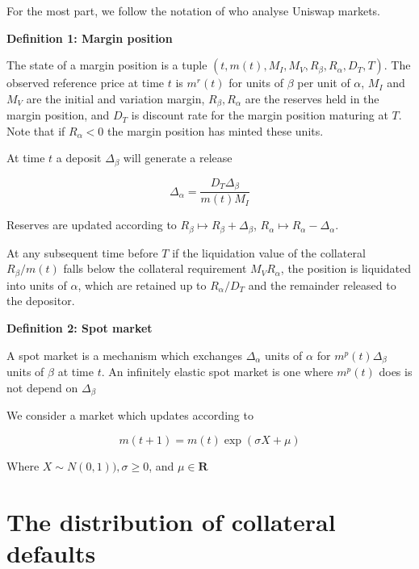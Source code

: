 \documentclass[12pt]{article}
\begin{document}
For the most part, we follow the notation of \cite{ang20} who analyse Uniswap markets.

\textbf{Definition 1: Margin position}


The state of a margin position is a tuple $(t, m(t), M_I, M_V, R_\beta, R_\alpha, D_T, T)$. The observed reference price at time $t$ is $m^r(t)$ for units of $\beta$ per unit of $\alpha$, $M_I$ and $M_V$ are the initial and variation margin, $R_\beta, R_\alpha$ are the reserves held in the margin position, and $D_T$ is discount rate for the margin position maturing at $T$. Note that if $R_\alpha<0$ the margin position has minted these units.

At time $t$ a deposit $\Delta_\beta$  will generate a release 

\begin{equation} \label{Delta_alpha}
\Delta_\alpha = \frac{D_T \Delta_\beta}{m(t) M_I }
\end{equation}


Reserves are updated according to $R_\beta \mapsto R_\beta + \Delta_\beta$, $R_\alpha \mapsto R_\alpha - \Delta_\alpha$. 

At any subsequent time before $T$ if the liquidation value of the collateral $R_\beta/m(t)$ falls below the collateral requirement $M_V R_\alpha$, the position is liquidated into units of $\alpha$, which are retained up to $R_\alpha/D_T$ and the remainder released to the depositor.   

\textbf{Definition 2: Spot market}

A spot market is a mechanism which exchanges $\Delta_\alpha$ units of $\alpha$ for $m^p(t)\Delta_\beta$ units of $\beta$ at time $t$. An infinitely elastic spot market is one where $m^p(t)$ does is not depend on $\Delta_\beta$

We consider a market which updates according to 

\[ m(t+1) = m(t)\exp( \sigma X + \mu) \]

Where $X \sim N(0,1)), \sigma \geq 0$, and  $\mu \in \mathbf{R}$

\section{The distribution of collateral defaults}
\end{document}
